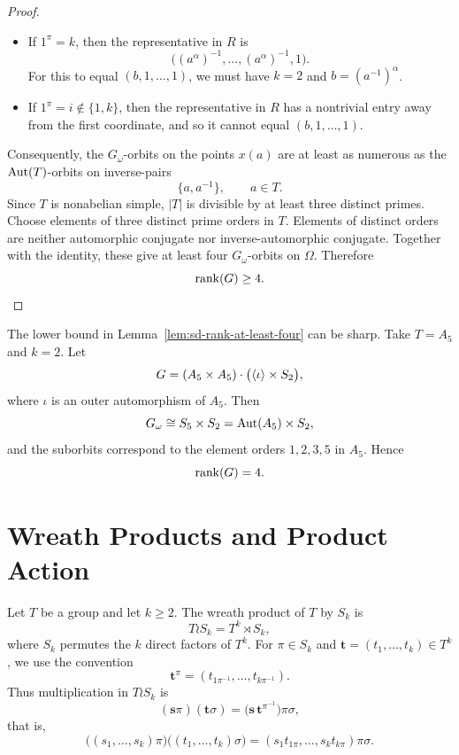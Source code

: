 \begin{proof}
\begin{itemize}[leftmargin=2em]
    \item If $1^\pi=k$, then the representative in $R$ is
    \[
        \bigl((a^\alpha)^{-1},\ldots,(a^\alpha)^{-1},1\bigr).
    \]
    For this to equal $(b,1,\ldots,1)$, we must have $k=2$ and $b=(a^{-1})^\alpha$.

    \item If $1^\pi=i\notin\{1,k\}$, then the representative in $R$ has a nontrivial entry away from the first coordinate, and so it cannot equal $(b,1,\ldots,1)$.
\end{itemize}

Consequently, the $G_\omega$-orbits on the points $x(a)$ are at least as numerous as the $\operatorname{Aut}(T)$-orbits on inverse-pairs
\[
    \{a,a^{-1}\},\qquad a\in T.
\]
Since $T$ is nonabelian simple, $|T|$ is divisible by at least three distinct primes.  Choose elements of three distinct prime orders in $T$.  Elements of distinct orders are neither automorphic conjugate nor inverse-automorphic conjugate.  Together with the identity, these give at least four $G_\omega$-orbits on $\Omega$.  Therefore
\[
    \operatorname{rank}(G)\geq 4.
\]
\end{proof}

\begin{example}
The lower bound in Lemma~\ref{lem:sd-rank-at-least-four} can be sharp.  Take $T=A_5$ and $k=2$.  Let
\[
    G=(A_5\times A_5)\cdot \bigl(\langle \iota\rangle\times S_2\bigr),
\]
where $\iota$ is an outer automorphism of $A_5$.  Then
\[
    G_\omega\cong S_5\times S_2=\operatorname{Aut}(A_5)\times S_2,
\]
and the suborbits correspond to the element orders $1,2,3,5$ in $A_5$.  Hence
\[
    \operatorname{rank}(G)=4.
\]
\end{example}

\section{Wreath Products and Product Action}

\begin{definition}
Let $T$ be a group and let $k\geq 2$.  The wreath product of $T$ by $S_k$ is
\[
    T\wr S_k=T^k\rtimes S_k,
\]
where $S_k$ permutes the $k$ direct factors of $T^k$.  For $\pi\in S_k$ and
$\mathbf t=(t_1,\ldots,t_k)\in T^k$, we use the convention
\[
    \mathbf t^\pi=(t_{1\pi^{-1}},\ldots,t_{k\pi^{-1}}).
\]
Thus multiplication in $T\wr S_k$ is
\[
    (\mathbf s\pi)(\mathbf t\sigma)
    =\bigl(\mathbf s\,\mathbf t^{\pi^{-1}}\bigr)\pi\sigma,
\]
that is,
\[
    \bigl((s_1,\ldots,s_k)\pi\bigr)
    \bigl((t_1,\ldots,t_k)\sigma\bigr)
    =
    (s_1t_{1\pi},\ldots,s_kt_{k\pi})\pi\sigma.
\]
\end{definition}


